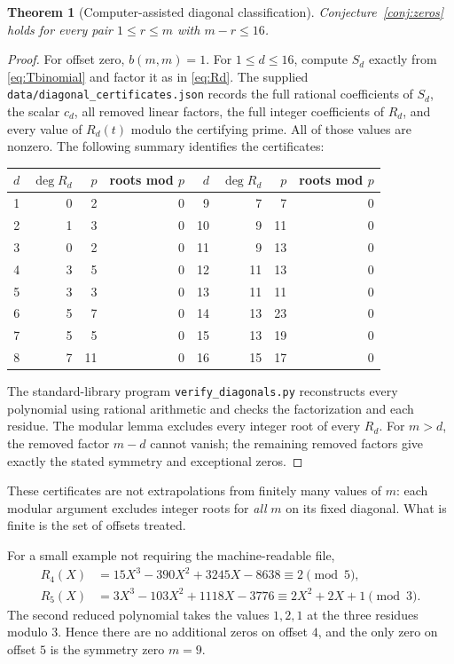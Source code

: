\documentclass[11pt,a4paper]{article}
\numberwithin{equation}{section}
\newtheorem{theorem}{Theorem}[section]
\theoremstyle{definition}
\theoremstyle{remark}
\begin{document}
\begin{theorem}[Computer-assisted diagonal classification]\label{thm:16}
Conjecture~\ref{conj:zeros} holds for every pair $1\le r\le m$ with
$m-r\le16$.
\end{theorem}
\begin{proof}
For offset zero, $b(m,m)=1$. For $1\le d\le16$, compute $S_d$ exactly from
\eqref{eq:Tbinomial} and factor it as in \eqref{eq:Rd}. The supplied
\texttt{data/diagonal\_certificates.json} records the full rational
coefficients of $S_d$, the scalar $c_d$, all removed linear factors, the
full integer coefficients of $R_d$, and every value of $R_d(t)$ modulo
the certifying prime. All of those values are nonzero. The following
summary identifies the certificates:
\begin{center}
\begin{tabular}{rrrr@{\qquad}rrrr}
\toprule
$d$&$\deg R_d$&$p$&roots mod $p$&$d$&$\deg R_d$&$p$&roots mod $p$\\
\midrule
1&0&2&0&9&7&7&0\\
2&1&3&0&10&9&11&0\\
3&0&2&0&11&9&13&0\\
4&3&5&0&12&11&13&0\\
5&3&3&0&13&11&11&0\\
6&5&7&0&14&13&23&0\\
7&5&5&0&15&13&19&0\\
8&7&11&0&16&15&17&0\\
\bottomrule
\end{tabular}
\end{center}
The standard-library program \texttt{verify\_diagonals.py} reconstructs
every polynomial using rational arithmetic and checks the factorization
and each residue. The modular lemma excludes every integer root of every
$R_d$. For $m>d$, the removed factor $m-d$ cannot vanish; the remaining
removed factors give exactly the stated symmetry and exceptional zeros.
\end{proof}

These certificates are not extrapolations from finitely many values of
$m$: each modular argument excludes integer roots for \emph{all} $m$ on
its fixed diagonal. What is finite is the set of offsets treated.

For a small example not requiring the machine-readable file,
\begin{align*}
 R_4(X)&=15X^3-390X^2+3245X-8638\equiv2\pmod5,\\
 R_5(X)&=3X^3-103X^2+1118X-3776
                  \equiv2X^2+2X+1\pmod3.
\end{align*}
The second reduced polynomial takes the values $1,2,1$ at the three
residues modulo $3$. Hence there are no additional zeros on offset $4$,
and the only zero on offset $5$ is the symmetry zero $m=9$.
\end{document}
